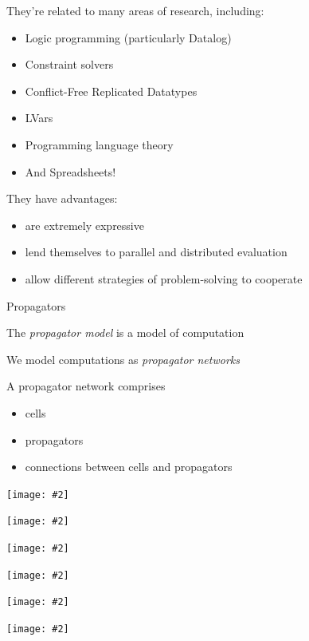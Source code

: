 \documentclass[usenames,dvipsnames,svgnames,table,aspectratio=1610,mathserif]{beamer}
\newcommand{\nl}{\vspace{\baselineskip}}
\newcommand{\pnl}{\pause \nl}
\newcommand{\imageslide}[2][1]{{
\begin{frame}\begin{center}
\texttt{[image: \#2]}
\end{center}\end{frame}
}}
\begin{document}
\begin{frame}
They're related to many areas of research, including:

\begin{itemize}
\item Logic programming (particularly Datalog)
\item Constraint solvers
\item Conflict-Free Replicated Datatypes
\item LVars
\item Programming language theory
\item And Spreadsheets!
\end{itemize}

They have advantages:

\begin{itemize}
\item are extremely expressive
\item lend themselves to parallel and distributed evaluation
\item allow different strategies of problem-solving to cooperate
\end{itemize}
\end{frame}




\begin{frame}

\begin{center}
{\Huge Propagators}
\end{center}

\end{frame}


\begin{frame}
The {\it propagator model} is a model of computation

We model computations as {\it propagator networks}

\pnl

A propagator network comprises
\begin{itemize}
\item cells
\item propagators
\item connections between cells and propagators
\end{itemize}

\end{frame}


\imageslide{cell1.pdf}
\imageslide{cell2.pdf}
\imageslide{prop.pdf}

\imageslide{upper1.pdf}
\imageslide{upper2.pdf}
\imageslide{upper3.pdf}
\end{document}
